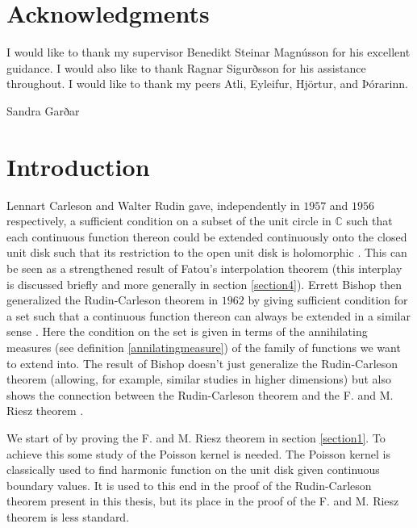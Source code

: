 \documentclass[a4paper,12pt,twoside,BCOR=10mm]{scrbook}
\theoremstyle{definition}
\theoremstyle{definition}
\theoremstyle{definition}
\begin{document}
\tableofcontents



\chapter*{Acknowledgments}
I would like to thank my supervisor Benedikt Steinar Magnússon for his excellent guidance.
I would also like to thank Ragnar Sigurðsson for his assistance throughout.
I would like to thank my peers Atli, Eyleifur, Hjörtur, and Þórarinn.

Sandra
Garðar

\setcounter{page}{1}
\chapter{Introduction}
Lennart Carleson and Walter Rudin gave, independently in $1957$ and $1956$ respectively, a sufficient condition on a subset of the unit circle in $\mathbb{C}$ such that each continuous function thereon could be extended continuously onto the closed unit disk such that its restriction to the open unit disk is holomorphic \citep{rudin, carleson}.
This can be seen as a strengthened result of Fatou's interpolation theorem \citep{fatou} (this interplay is discussed briefly and more generally in section \ref{section4}).
Errett Bishop then generalized the Rudin-Carleson theorem in $1962$ by giving sufficient condition for a set such that a continuous function thereon can always be extended in a similar sense \citep{bishop}.
Here the condition on the set is given in terms of the annihilating measures (see definition \ref{annilatingmeasure}) of the family of functions we want to extend into.
The result of Bishop doesn't just generalize the Rudin-Carleson theorem (allowing, for example, similar studies in higher dimensions) but also shows the connection between the Rudin-Carleson theorem and the F. and M. Riesz theorem \citep{fandmriesz}.

We start of by proving the F. and M. Riesz theorem in section \ref{section1}.
To achieve this some study of the Poisson kernel is needed.
The Poisson kernel is classically used to find harmonic function on the unit disk given continuous boundary values.
It is used to this end in the proof of the Rudin-Carleson theorem present in this thesis, but its place in the proof of the F. and M. Riesz theorem is less standard.
\end{document}
